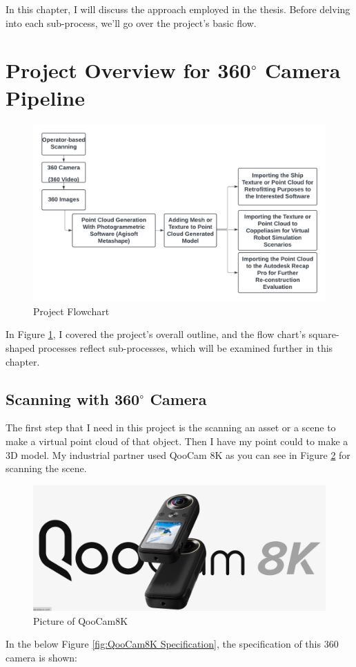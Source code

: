 

\noindent In this chapter, I will discuss the approach employed in the thesis. Before delving into each sub-process, we'll go over the project's basic flow. 


\section{Project Overview for 360$^{\circ}$ Camera Pipeline}


\begin{figure}[H]
  \centering
  \includegraphics[width= 1.0\textwidth]{Figures/Project Flowchart.png}
  \caption[Illustration of Project Overview ]{Project Flowchart}
  \label{fig:Project Flowchart}
\end{figure}

In Figure \ref{fig:Project Flowchart}, I covered the project's overall outline, and the flow chart's square-shaped processes reflect sub-processes, which will be examined further in this chapter.


\subsection{Scanning with 360$^{\circ}$ Camera}
The first step that I need in this project is the scanning an asset or a scene to make a virtual point cloud of that object. Then I have my point could to make a 3D model. My industrial partner used QooCam 8K as you can see in Figure \ref{fig:QoooCam8K picture} for scanning the scene.  
\begin{figure}[H]
  \centering
  \includegraphics[width= 1.0\textwidth]{Figures/QooCam8K.PNG}
  \caption[Picture of QooCam8K]{Picture of QooCam8K \cite{QooCam8K}}
  \label{fig:QoooCam8K picture}
\end{figure}
\noindent In the below Figure \ref{fig:QooCam8K Specification}, the specification of this 360 camera is shown:

